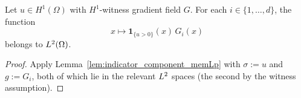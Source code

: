 \begin{lemma}
\label{lem:posPartGrad}
\leanok
{}
Let $u \in H^1(\Omega)$ with $H^1$-witness gradient field $G$. For each
$i \in \{1,\ldots,d\}$, the function
\begin{equation*}
  x \mapsto \mathbf{1}_{\{u > 0\}}(x)\,G_i(x)
\end{equation*}
belongs to $L^{2}(\Omega)$.
\end{lemma}

\begin{proof}
\leanok
{}

Apply Lemma~\ref{lem:indicator_component_memLp} with $\sigma := u$ and $g :=
G_i$, both of which lie in the relevant $L^{2}$ spaces (the second by the
witness assumption).
\end{proof}


